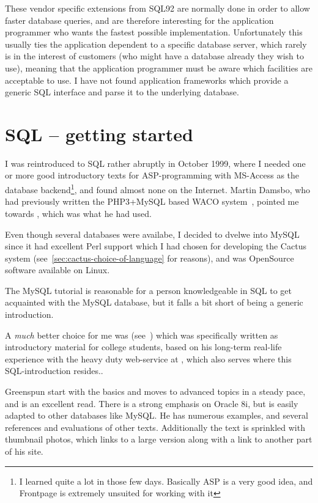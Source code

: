 These vendor specific extensions from SQL92 are normally done in order
to allow faster database queries, and are therefore interesting for
the application programmer who wants the fastest possible
implementation.  Unfortunately this usually ties the application
dependent to a specific database server, which rarely is in the
interest of customers (who might have a database already they wish to
use), meaning that the application programmer must be aware which
facilities are acceptable to use.  I have not found application
frameworks which provide a generic SQL interface and parse it to the
underlying database.


\section{SQL -- getting started}
\label{sec:sql-getting-started}

I was reintroduced to SQL rather abruptly in October 1999, where I
needed one or more good introductory texts for ASP-programming with
MS-Access as the database backend\footnote{I learned quite a lot in
  those few days.  Basically ASP is a very good idea, and Frontpage is
  extremely unsuited for working with it}, and found almost none on
the Internet.  Martin Damsbo, who had previously written the
PHP3+MySQL based WACO system~\cite{mez-waco}, pointed me towards
, which was what he had used.

Even though several databases were availabe, I decided to dvelwe into
MySQL since it had excellent Perl support which I had chosen for
developing the Cactus system (see~\vref{sec:cactus-choice-of-language}
for reasons), and was OpenSource software available on Linux.

The MySQL tutorial is reasonable for a person knowledgeable in SQL to
get acquainted with the MySQL database, but it falls a bit short of
being a generic introduction.


A \textit{much} better choice for me was
(see~\cite{greenspun-sql}) which was specifically written as
introductory material for college students, based on his long-term
real-life experience with the heavy duty web-service at
, which also serves
 where this SQL-introduction
resides..

Greenspun start with the basics and moves to advanced
topics in a steady pace, and is an excellent read.  There is a strong
emphasis on Oracle 8i, but is easily adapted to other databases like
MySQL.  He has numerous examples, and several references and
evaluations of other texts.  Additionally the text is sprinkled with
thumbnail photos, which links to a large version along with a link to
another part of his site.

